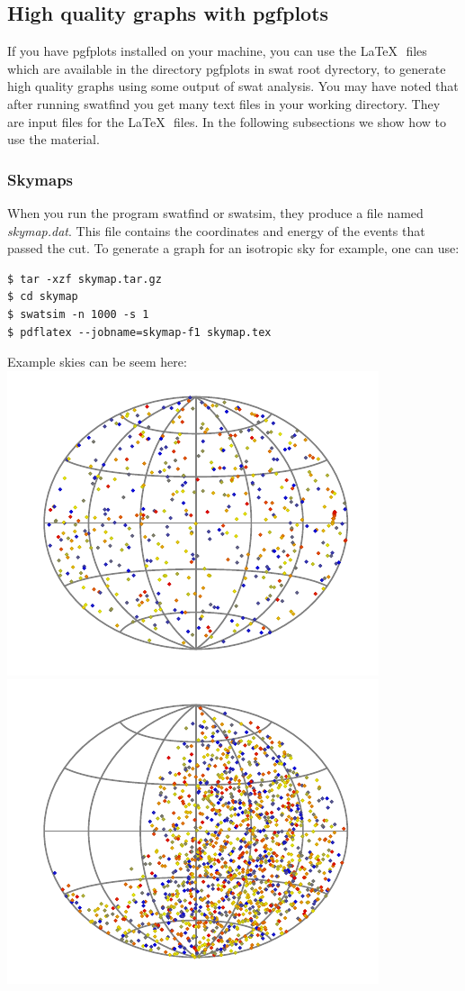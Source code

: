 \documentclass[12pt]{article}
\begin{document}
\subsection{High quality graphs with pgfplots} \label{ch::pgfplots}
If you have pgfplots installed on your machine, you can use the \LaTeX\,\,
files which are available in the directory {\color{textcolor}pgfplots} in swat
root dyrectory, to generate high quality graphs using some output of swat
analysis.  You may have noted that after running {\color{textcolor}swatfind}
you get many text files in your working directory. They are input files for the
\LaTeX\,\, files. In the following subsections we show how to use the material.
\subsubsection{Skymaps}
When you run the program {\color{textcolor}swatfind} or {\color{textcolor}swatsim}, they produce a file named
{\it skymap.dat}. This file contains the coordinates and energy of the events that
passed the cut. To generate a graph for an isotropic sky for example, one can
use:
{\bf \color{textcolor}
\begin{lstlisting}
$ tar -xzf skymap.tar.gz
$ cd skymap
$ swatsim -n 1000 -s 1
$ pdflatex --jobname=skymap-f1 skymap.tex
\end{lstlisting}
}
Example skies can be seem here:\\
\includegraphics[scale=1.0]{skymap-sim.pdf} 
\includegraphics[scale=1.0]{skymap.pdf}
\end{document}
